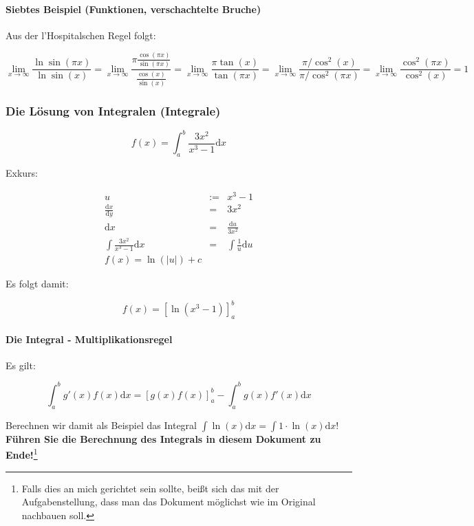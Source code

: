 \documentclass[12pt]{report}
\begin{document}
\paragraph{Siebtes Beispiel (Funktionen, verschachtelte Bruche)}
Aus der l’Hospitalschen Regel folgt:

\[
\lim_{x \rightarrow \infty} \frac{\ln\sin(\pi x)}{\ln\sin(x)} =
\lim_{x \rightarrow \infty} \frac
	{\pi \frac{\cos(\pi x)}{\sin(\pi x)}}
	{\frac{\cos(x)}{\sin(x)}} =
\lim_{x \rightarrow \infty} \frac{\pi \tan(x)}{\tan(\pi x)} =
\lim_{x \rightarrow \infty} \frac{\pi / \cos^2(x)}{\pi / \cos^2(\pi x)} =
\lim_{x \rightarrow \infty} \frac{\cos^2(\pi x)}{\cos^2(x)} =
1
\]

\subsubsection{Die Lösung von Integralen (Integrale)}
\begin{equation}
f(x)=\int_a^b \frac{3x^2}{x^3-1} \mathrm dx
\end{equation}

Exkurs:

\begin{eqnarray}
u &:=& x^3-1 \nonumber \\
\frac{\mathrm dx}{\mathrm dy} &=& 3x^2 \nonumber \\
\mathrm dx &=& \frac{\mathrm du}{3x^2} \nonumber \\
\int \frac{3x^2}{x^3-1} \mathrm dx &=& \int \frac{1}{u} \mathrm du \\
f(x) = \ln(|u|) + c
\end{eqnarray}

Es folgt damit:

\[ f(x) = [\ln(x^3-1)]_a^b \]

\paragraph{Die Integral - Multiplikationsregel}

Es gilt:

\[ \int_a^b g'(x)f(x)\mathrm dx = [g(x)f(x)]_a^b - \int_a^b g(x)f'(x)\mathrm dx \]

Berechnen wir damit als Beispiel das Integral $\int \ln(x) \mathrm dx = \int 1 \cdot \ln(x) \mathrm dx$!
\textbf{Führen Sie die Berechnung des Integrals in diesem Dokument zu Ende!}\footnote{Falls dies an mich gerichtet sein sollte, beißt sich das mit der Aufgabenstellung, dass man das Dokument möglichst wie im Original nachbauen soll.}
\end{document}
